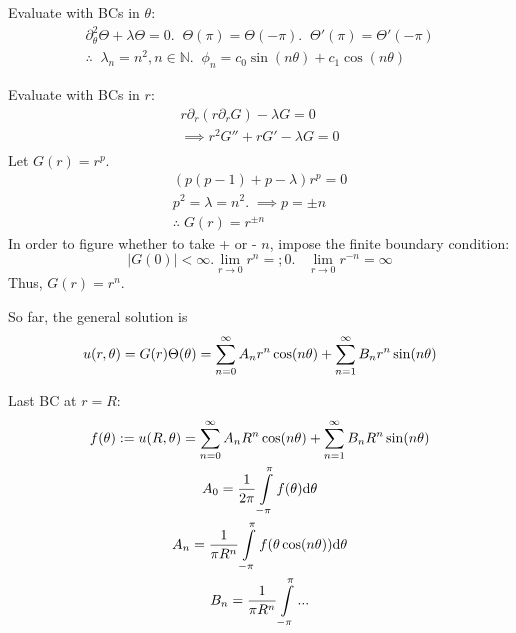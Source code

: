 Evaluate with BCs in $\theta$:
\begin{gather*}
	\partial_\theta^2 \Theta + \lambda \Theta = 0. \;\; \Theta(\pi) = \Theta(-\pi). \;\; \Theta'(\pi) = \Theta'(-\pi) \\
	\therefore \;\; \boxed{\lambda_n = n^2, n\in \mathbb{N}. \;\; \phi_n = c_0 \sin(n\theta) + c_1 \cos (n \theta) } 
\end{gather*}

Evaluate with BCs in $r$: 
\begin{gather*}
	r\partial_r ( r\partial_r G) - \lambda G = 0 \\
	\implies r^2 G'' + rG' - \lambda G = 0 \\
\end{gather*}
Let $G(r) = r^p$. 
\begin{gather*}
	(p(p-1) + p - \lambda) r^p  = 0 \\
	p^2  = \lambda  = n^2. \; \implies p = \pm n \\
	\therefore \; G(r) = r^{\pm n}
\end{gather*}
In order to figure whether to take + or - $n$, impose the finite boundary condition:
\[ |G(0)| < \infty. \lim_{r\to 0} r^n = ; 0. \;\;\; \lim_{r\to 0} r^{-n} = \infty \]
Thus, $G(r) = r^n$.

So far, the general solution is 
\[u(r, \theta) = G(r) \Theta(\theta) = \sum\limits_{n=0}^\infty A_n r^n \cos(n\theta) + \sum\limits_{n=1}^\infty B_n r^n \sin(n\theta) \]

Last BC at $r=R$:
\begin{gather*}
	f(\theta) := u(R, \theta) = \sum\limits_{n=0}^\infty A_n R^n \cos (n\theta) + \sum\limits_{n=1}^\infty B_n R^n \sin(n\theta) \\
	A_0 = \frac{1}{2\pi} \int\limits_{-\pi}^\pi f(\theta) \text{d} \theta \\
	A_n = \frac{1}{\pi R^n} \int\limits_{-\pi}^\pi f(\theta \cos (n\theta)) \text{d} \theta \\
	B_n = \frac{1}{\pi R^n} \int\limits_{-\pi}^\pi ...
\end{gather*}


